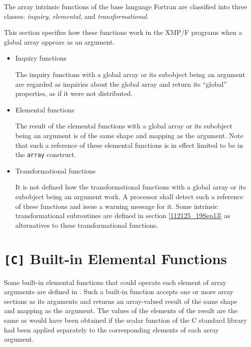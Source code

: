 The array intrinsic functions of the base language Fortran are
classified into three classes: {\it inquiry}, {\it elemental}, and
{\it transformational}.

This section specifies how these functions work in the XMP/F
programs when a global array appears as an argument.

\begin{itemize}
 \item Inquiry functions

       The inquiry functions with a global array or its subobject
       being an argument are regarded as inquiries about the global
       array and return its ``global'' properties, as if it were not
       distributed.

 \item Elemental functions

       The result of the elemental functions with a global array or
       its subobject being an argument is of the same shape and
       mapping as the argument.
%
       Note that such a reference of these elemental functions is in
       effect limited to be in the {\tt array} construct.

 \item Transformational functions

       It is not defined how the transformational functions with a
       global array or its subobject being an argument work.
%
       A processor shall detect such a reference of these functions
       and issue a warning message for it.
%
       Some intrinsic transformational subroutines are defined in
       section \ref{112125_19Sep13} as alternatives to these
       transformational functions.

\end{itemize}


\section{{\tt [C]} Built-in Elemental Functions}
\label{094142_25Sep13}

Some built-in elemental functions that could operate each element of
array arguments are defined in {\XMPC}. Such a built-in function
accepts one or more array sections as its arguments and returns an
array-valued result of the same shape and mapping as the argument.
%
The values of the elements of the result are the same as would have
been obtained if the scalar function of the C standard library had
been applied separately to the corresponding elements of each array
argument.

